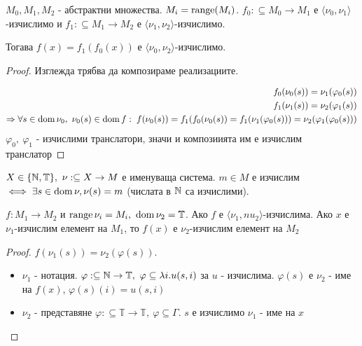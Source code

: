 \begin{proposition}
    $M_0, M_1, M_2$ - абстрактни множества. $M_i = \operatorname*{range}(M_i)$. $f_0: \subseteq M_0 \to M_1$ е $\langle\nu_0, \nu_1\rangle$-изчислимо и $f_1: \subseteq M_1 \to M_2$ е $\langle\nu_1, \nu_2\rangle$-изчислимо.

    Тогава $f(x) = f_1(f_0(x))$ е $\langle\nu_0, \nu_2\rangle$-изчислимо.
\end{proposition}
\begin{proof}
    Изглежда трябва да композираме реализациите.

    \begin{equation}
        \begin{split}
            f_0(\nu_0(s)) = \nu_1(\varphi_0(s)) \\
            f_1(\nu_1(s)) = \nu_2(\varphi_1(s)) \\
            \Rightarrow \forall s \in\operatorname*{dom}\nu_0,\ \nu_0(s) \in \operatorname*{dom} f:\;  f(\nu_0(s)) = f_1(f_0(\nu_0(s)) = f_1(\nu_1(\varphi_0(s))) = \nu_2(\varphi_1(\varphi_0(s)))
        \end{split}
    \end{equation}
    $\varphi_0,\ \varphi_1$ - изчислими транслатори, значи и композиията им е изчислим транслатор
\end{proof}
\begin{definition}
    $X\in \{{\mathbb{N}}, \mathbb T\},\ \nu: \subseteq X \to M$ е именуваща система. $m\in M$ е изчислим $\iff \exists s \in \operatorname*{dom} \nu, \nu(s) = m$ (числата в ${\mathbb{N}}$ са изчислими).
\end{definition}
\begin{proposition}
    $f: M_1 \to M_2$ и $\operatorname*{range}\nu_i = M_i,\ \operatorname*{dom} \nu_2 = \mathbb T$. Ако $f$ е $\langle \nu_1, nu_2\rangle$-изчислима. Ако $x$ е $\nu_1$-изчислим елемент на $M_1$, то $f(x)$ е $\nu_2$-изчислим елемент на $M_2$ 
\end{proposition}
\begin{proof}
    $f(\nu_1(s)) = \nu_2(\varphi(s))$.
    \begin{itemize}
        \item[\Rn{1} сл.] $\nu_1$ - нотация. $\varphi: \subseteq {\mathbb{N}} \to \mathbb T,\ \varphi \subseteq \lambda i. u(s,i)$ за $u$ - изчислима. $\varphi(s)$ е $\nu_2$ - име на $f(x)$, $\varphi(s)(i) = u(s, i)$
        \item[\Rn{2} сл.] $\nu_2$ - представяне $\varphi: \subseteq \mathbb T \to \mathbb T,\ \varphi \subseteq \Gamma$. $s$ е изчислимо $\nu_1$ - име на $x$
    \end{itemize}
\end{proof}